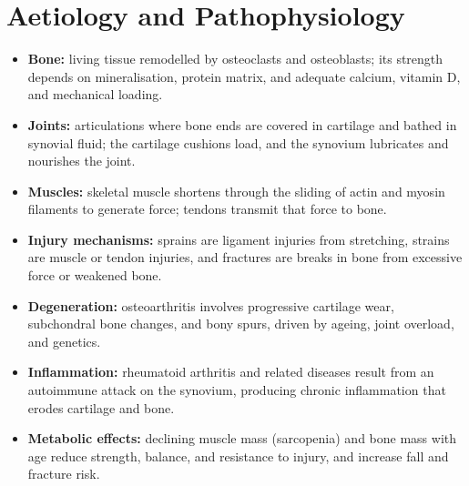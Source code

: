 \section*{Aetiology and Pathophysiology}
\begin{itemize}
    \item \textbf{Bone:} living tissue remodelled by osteoclasts and osteoblasts; its strength depends on mineralisation, protein matrix, and adequate calcium, vitamin D, and mechanical loading.
    \item \textbf{Joints:} articulations where bone ends are covered in cartilage and bathed in synovial fluid; the cartilage cushions load, and the synovium lubricates and nourishes the joint.
    \item \textbf{Muscles:} skeletal muscle shortens through the sliding of actin and myosin filaments to generate force; tendons transmit that force to bone.
    \item \textbf{Injury mechanisms:} sprains are ligament injuries from stretching, strains are muscle or tendon injuries, and fractures are breaks in bone from excessive force or weakened bone.
    \item \textbf{Degeneration:} osteoarthritis involves progressive cartilage wear, subchondral bone changes, and bony spurs, driven by ageing, joint overload, and genetics.
    \item \textbf{Inflammation:} rheumatoid arthritis and related diseases result from an autoimmune attack on the synovium, producing chronic inflammation that erodes cartilage and bone.
    \item \textbf{Metabolic effects:} declining muscle mass (sarcopenia) and bone mass with age reduce strength, balance, and resistance to injury, and increase fall and fracture risk.
\end{itemize}

